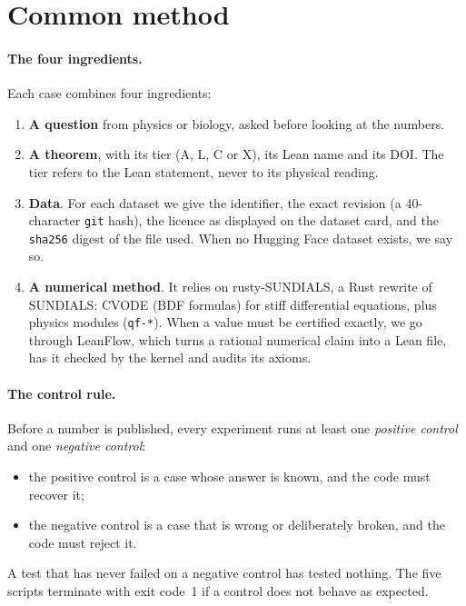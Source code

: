 \section{Common method}\label{ch5:methode}

\paragraph{The four ingredients.} Each case combines four ingredients:
\begin{enumerate}
\item \textbf{A question} from physics or biology, asked before looking at the numbers.
\item \textbf{A theorem}, with its tier (A, L, C or X), its Lean name and its DOI. The tier refers to
the Lean statement, never to its physical reading.
\item \textbf{Data}. For each dataset we give the identifier, the exact revision (a 40-character \texttt{git}
hash), the licence as displayed on the dataset card, and the \texttt{sha256} digest of the
file used. When no Hugging Face dataset exists, we say so.
\item \textbf{A numerical method}. It relies on rusty-SUNDIALS, a Rust rewrite of SUNDIALS: CVODE
(BDF formulas) for stiff differential equations, plus physics modules (\texttt{qf-*}). When
a value must be certified exactly, we go through LeanFlow, which turns a rational numerical claim
into a Lean file, has it checked by the kernel and audits its axioms.
\end{enumerate}

\paragraph{The control rule.} Before a number is published, every experiment runs at least one
\emph{positive control} and one \emph{negative control}:
\begin{itemize}
\item the positive control is a case whose answer is known, and the code must recover it;
\item the negative control is a case that is wrong or deliberately broken, and the code must reject it.
\end{itemize}
A test that has never failed on a negative control has tested nothing. The five scripts terminate with exit
code~1 if a control does not behave as expected.

